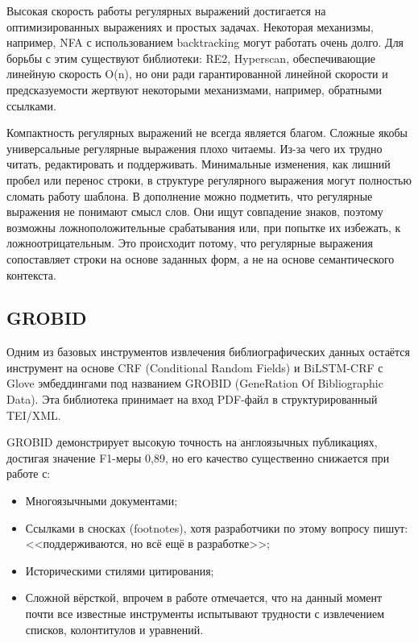 Высокая скорость работы регулярных выражений достигается на оптимизированных выражениях и простых задачах. Некоторая механизмы, например, NFA с использованием backtracking могут работать очень долго. Для борьбы с этим существуют библиотеки: RE2\cite{horky2022automata}, Hyperscan\cite{shuai2021performance}, обеспечивающие линейную скорость O(n), но они ради гарантированной линейной скорости и предсказуемости жертвуют некоторыми механизмами, например, обратными ссылками.

Компактность регулярных выражений не всегда является благом. Сложные якобы универсальные регулярные выражения плохо читаемы. Из-за чего их трудно читать, редактировать и поддерживать. Минимальные изменения, как лишний пробел или перенос строки, в структуре регулярного выражения могут полностью сломать работу шаблона. В дополнение можно подметить, что регулярные выражения не понимают смысл слов. Они ищут совпадение знаков, поэтому возможны ложноположительные срабатывания или, при попытке их избежать, к ложноотрицательным. Это происходит потому, что регулярные выражения сопоставляет строки на основе заданных форм, а не на основе семантического контекста.

\subsection{GROBID}

Одним из базовых инструментов извлечения библиографических данных остаётся инструмент на основе CRF (Conditional Random Fields) и BiLSTM-CRF с Glove эмбеддингами под названием GROBID (GeneRation Of Bibliographic Data)\cite{romary2015grobid}. Эта библиотека принимает на вход PDF-файл в структурированный TEI/XML.

GROBID демонстрирует высокую точность на англоязычных публикациях\cite{tkaczyk2018machine}, достигая значение F1-меры 0,89, но его качество существенно снижается при работе с:
\begin{itemize}
    \item Многоязычными документами;
    \item Ссылками в сносках (footnotes), хотя разработчики по этому вопросу пишут: <<поддерживаются, но всё ещё в разработке>>;
    \item Историческими стилями цитирования;
    \item Сложной вёрсткой, впрочем в работе\cite{meuschke2023benchmark} отмечается, что на данный момент почти все известные инструменты испытывают трудности с извлечением списков, колонтитулов и уравнений.  
\end{itemize}

